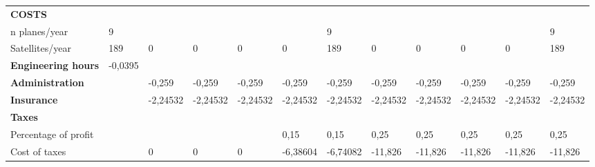 \begin{landscape}
\begin{table}[]
{\begin{tabular}{| l |l|l|l|l|l|l|l|l|l|l|l|}
\\ \hline
\rowcolor[gray]{0.85}
\textbf{COSTS}                                                                         &         &                &                &                &                &                &                &                &                &                &                \\ 
n planes/year                                                                          & 9       &                &                &                &                & 9              &                &                &                &                & 9              \\
Satellites/year                                                                        & 189     & 0              & 0              & 0              & 0              & 189            & 0              & 0              & 0              & 0              & 189            \\
\textbf{Engineering hours}                                                             & -0,0395 &                &                &                &                &                &                &                &                &                &                \\
\textbf{Administration}                                                                &         & -0,259         & -0,259         & -0,259         & -0,259         & -0,259         & -0,259         & -0,259         & -0,259         & -0,259         & -0,259         \\
\textbf{Insurance}                                                                     &         & -2,24532       & -2,24532       & -2,24532       & -2,24532       & -2,24532       & -2,24532       & -2,24532       & -2,24532       & -2,24532       & -2,24532       \\
\textbf{Taxes}                                                                         &         &                &                &                &                &                &                &                &                &                &                \\
Percentage of profit                                                                   &         &                &                &                & 0,15           & 0,15           & 0,25           & 0,25           & 0,25           & 0,25           & 0,25           \\
Cost of taxes                                                                          &         & 0              & 0              & 0              & -6,38604       & -6,74082       & -11,826        & -11,826        & -11,826        & -11,826        & -11,826        \\

\end{tabular}}
\end{table}
\end{landscape}
